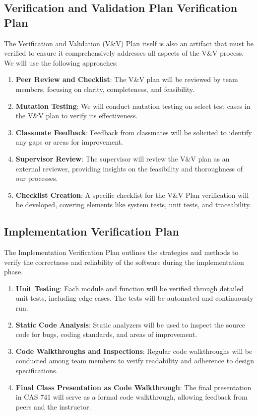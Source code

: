 \documentclass[12pt, titlepage]{article}
\begin{document}
\subsection{Verification and Validation Plan Verification Plan}
The Verification and Validation (V\&V) Plan itself is also an artifact that must be verified to ensure it comprehensively addresses all aspects of the V\&V process. We will use the following approaches:

\begin{enumerate}
    \item \textbf{Peer Review and Checklist}: The V\&V plan will be reviewed by team members, focusing on clarity, completeness, and feasibility.
    \item \textbf{Mutation Testing}: We will conduct mutation testing on select test cases in the V\&V plan to verify its effectiveness.
    \item \textbf{Classmate Feedback}: Feedback from classmates will be solicited to identify any gaps or areas for improvement.
    \item \textbf{Supervisor Review}: The supervisor will review the V\&V plan as an external reviewer, providing insights on the feasibility and thoroughness of our processes.
    \item \textbf{Checklist Creation}: A specific checklist for the V\&V Plan verification will be developed, covering elements like system tests, unit tests, and traceability.
\end{enumerate}

\subsection{Implementation Verification Plan}
The Implementation Verification Plan outlines the strategies and methods to verify the correctness and reliability of the software during the implementation phase.

\begin{enumerate}
    \item \textbf{Unit Testing}: Each module and function will be verified through detailed unit tests, including edge cases. The tests will be automated and continuously run.
    \item \textbf{Static Code Analysis}: Static analyzers will be used to inspect the source code for bugs, coding standards, and areas of improvement.
    \item \textbf{Code Walkthroughs and Inspections}: Regular code walkthroughs will be conducted among team members to verify readability and adherence to design specifications.
    \item \textbf{Final Class Presentation as Code Walkthrough}: The final presentation in CAS 741 will serve as a formal code walkthrough, allowing feedback from peers and the instructor.
\end{enumerate}
\end{document}
